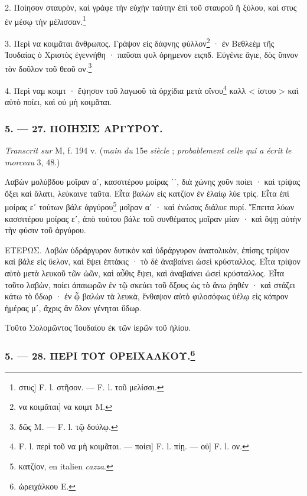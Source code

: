 \documentclass[a4paper, 11pt, oneside, polutonikogreek, french]{article}
\newcommand*\svgA{}
\begin{document}
2. Ποίησον σταυρὸν, καὶ γράφε τὴν εὐχὴν ταύτην ἐπὶ τοῦ σταυροῦ ἢ ξύλου, καὶ στυς ἐν μέσῳ τὴν μέλισσαν.\footnote{στυς] F. l. στῆσον. --- F. l. τοῦ μελίσσι.}

3. Περὶ να κοιμᾶται ἄνθρωπος. Γράψον εἰς δάφνης φύλλον\footnote{να κοιμᾶται] να κοιμτ M.} · ἐν Βεθλεὲμ τῆς Ἰουδαίας ὁ Χριστὸς ἐγεννήθη · παῦσαι φυλ ὀρημενον ειςπδ. Εὐγένιε ἅγιε, δὸς ὕπνον τὸν δοῦλον τοῦ θεοῦ ον.\footnote{δῶς M. --- F. l. τῷ δούλῳ.}

4. Περὶ ναμ κοιμτ · ἕψησον τοῦ λαγωοῦ τὰ ὀρχίδια μετὰ οἴνου\footnote{F. l. περὶ τοῦ να μὴ κοιμᾶται. --- ποίει] F. l. πίῃ. --- οὐ] F. l. ον.} καλλ < ίστου > καὶ αὐτὸ ποίει, καὶ οὐ μὴ κοιμᾶται.

\bigskip
\centerline{\EightStarTaper}
\centerline{\EightStarTaper\EightStarTaper}
\bigskip

\subsubsection{5. --- 27. ΠΟΙΗΣΙΣ ΑΡΓΥΡΟΥ.}

\emph{Transcrit sur} M, f. 194 v. (\emph{main du} 15e \emph{siècle} ; \emph{probablement celle qui a écrit le morceau} 3, 48.)

Λαβὼν μολύβδου μοῖραν αʹ, κασσιτέρου μοίρας $\svgA$ʹʹ, διὰ χώνης χοῦν ποίει · καὶ τρίψας ὄξει καὶ ἅλατι, λεύκαινε ταῦτα. Εἶτα βαλὼν εἰς κατζίον ἐν ἐλαίῳ λύε τρίς. Εἶτα ἐπὶ μοίρας εʹ τούτων βάλε ἀργύρου\footnote{κατζίον, en italien \emph{cazza}.} μοῖραν αʹ · καὶ ἑνώσας διάλυε πυρί. Ἔπειτα λύων κασσιτέρου μοίρας εʹ, ἀπὸ τούτου βάλε τοῦ συνθέματος μοῖραν μίαν · καὶ ὄψῃ αὐτὴν τὴν φύσιν τοῦ ἀργύρου.

ΕΤΕΡΩΣ. Λαβὼν ὑδράργυρον δυτικὸν καὶ ὑδράργυρον ἀνατολικὸν, ἐπίσης τρίψον καὶ βάλε εἰς ὕελον, καὶ ἕψει ἑπτάκις · τὸ δὲ ἀναβαίνει ὡσεὶ κρύσταλλος. Εἶτα τρίψον αὐτὸ μετὰ λευκοῦ τῶν ὠῶν, καὶ αὖθις ἕψει, καὶ ἀναβαίνει ὡσεὶ κρύσταλλος. Εἶτα τοῦτο λαβὼν, ποίει ἀπαιωρῶν ἐν τῷ σκεύει τοῦ ὄξους ὡς τὸ ἄνω ῥηθέν · καὶ στάζει κάτω τὸ ὕδωρ · ἐν ᾧ βαλὼν τὰ λευκὰ, ἔνθαψον αὐτὸ φιλοσόφως ὑέλῳ εἰς κόπρον ἡμέρας μʹ, ἄχρις ἂν ὅλον γένηται ὕδωρ.

Τοῦτο Σολομῶντος Ἰουδαίου ἐκ τῶν ἱερῶν τοῦ ἡλίου.

\bigskip
\centerline{\EightStarTaper}
\centerline{\EightStarTaper\EightStarTaper}
\bigskip

\subsubsection[5. --- 28. ΠΕΡΙ ΤΟΥ ΟΡΕΙΧΑΛΚΟΥ.]{5. --- 28. ΠΕΡΙ ΤΟΥ ΟΡΕΙΧΑΛΚΟΥ.\footnote{ὠρειχάλκου E.}}
\end{document}
